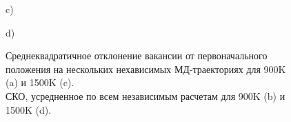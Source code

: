 \documentclass[master,14pt,subf,href,colorlinks=true
]{disser}
\begin{document}
\begin{figure}[h]
\begin{center}
\begin{minipage}[h]{0.47\linewidth}
\end{minipage}
\vfill
\begin{minipage}[h]{0.47\linewidth}
 c)
\end{minipage}
\hfill
\begin{minipage}[h]{0.47\linewidth}
 d)
\end{minipage}
\caption{Среднеквадратичное отклонение вакансии от первоначального положения на нескольких нехависимых МД-траекториях для 900K (a) и 1500K (c). \\СКО, усредненное по всем независимым расчетам для 900K (b) и 1500K (d).}
\label{graph_MSD}
\end{center}
\end{figure}
 
\end{document}
